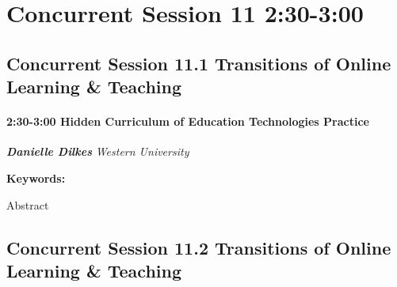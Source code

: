 \documentclass[
]{book}
\begin{document}
\hypertarget{concurrent-session-11-230-300}{%
\section*{Concurrent Session 11 \textbar{} 2:30-3:00}\label{concurrent-session-11-230-300}}

\hypertarget{concurrent-session-11.1-transitions-of-online-learning-teaching}{%
\subsection*{Concurrent Session 11.1 \textbar{} Transitions of Online Learning \& Teaching}\label{concurrent-session-11.1-transitions-of-online-learning-teaching}}

\begin{session}
\hypertarget{hidden-curriculum-of-education-technologies-practice}{%
\paragraph*{\texorpdfstring{2:30-3:00 \textbar{} \textbf{Hidden
Curriculum of Education Technologies} \textbar{}
Practice}{2:30-3:00 \textbar{} Hidden Curriculum of Education Technologies \textbar{} Practice}}\label{hidden-curriculum-of-education-technologies-practice}}

\textbf{\emph{Danielle Dilkes}} \textbar{} \emph{Western University}

\textbf{Keywords:}

Abstract
\end{session}

\hypertarget{concurrent-session-11.2-transitions-of-online-learning-teaching}{%
\subsection*{Concurrent Session 11.2 \textbar{} Transitions of Online Learning \& Teaching}\label{concurrent-session-11.2-transitions-of-online-learning-teaching}}
\end{document}
